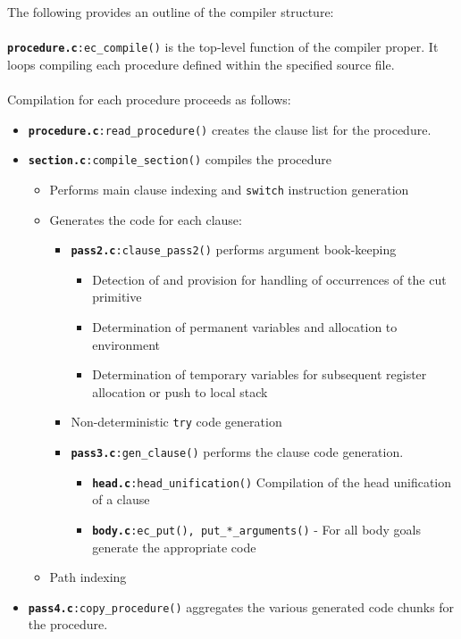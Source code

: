 The following provides an outline of the \eclipse compiler structure:
\\\\
{\tt {\bf procedure.c}:ec_compile()} is the top-level function of 
  the compiler proper. It loops compiling each procedure defined within 
  the specified source file.
\\\\
Compilation for each procedure proceeds as follows:
\begin{itemize}
\item {\tt {\bf procedure.c}:read_procedure()} creates the clause list for
  the procedure.
\item {\tt {\bf section.c}:compile_section()} compiles the procedure
\begin{itemize}
\item Performs main clause indexing and {\tt switch} instruction generation
\item Generates the code for each clause:
\begin{itemize}
\item {\tt {\bf pass2.c}:clause_pass2()} performs argument book-keeping
\begin{itemize}
\item  Detection of and provision for handling of occurrences of the cut primitive
 \item Determination of permanent variables and allocation to environment
 \item Determination of temporary variables for subsequent register
   allocation or push to local stack
\end{itemize}
\item Non-deterministic {\tt try} code generation
\item {\tt {\bf pass3.c}:gen_clause()} performs the clause code
    generation. 
\begin{itemize}
 \item {\tt {\bf head.c}:head_unification()} Compilation of the head
     unification of a clause
 \item {\tt {\bf body.c}:ec_put(), put_*_arguments()} - For all body goals 
     generate the appropriate code
\end{itemize}
\end{itemize}
\item Path indexing
\end{itemize}
\item {\tt {\bf pass4.c}:copy_procedure()} aggregates the various generated
    code chunks for the procedure.
\end{itemize}

